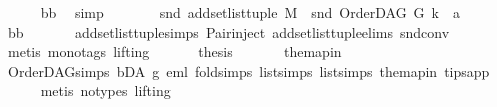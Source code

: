 \begin{isabellebody}
\ \ \ \ \isamarkupfalse%
\ bb\ \isamarkupfalse%
\ simp\ \isanewline
\ \ \isamarkupfalse%
\ \isamarkupfalse%
\ {\isachardoublequoteopen}\ snd\ {\isacharparenleft}{\kern0pt}add{\isacharunderscore}{\kern0pt}set{\isacharunderscore}{\kern0pt}list{\isacharunderscore}{\kern0pt}tuple\ {\isacharquery}{\kern0pt}M{\isacharparenright}{\kern0pt}\ {\isacharequal}{\kern0pt}\ snd\ {\isacharparenleft}{\kern0pt}OrderDAG\ G\ k{\isacharparenright}{\kern0pt}\ {\isacharat}{\kern0pt}\ {\isacharbrackleft}{\kern0pt}a{\isacharbrackright}{\kern0pt}{\isachardoublequoteclose}\isanewline
\ \ \ \ \isamarkupfalse%
\ bb\ \isanewline
\ \ \ \ \isamarkupfalse%
\ add{\isacharunderscore}{\kern0pt}set{\isacharunderscore}{\kern0pt}list{\isacharunderscore}{\kern0pt}tuple{\isachardot}{\kern0pt}simps\ Pair{\isacharunderscore}{\kern0pt}inject\ add{\isacharunderscore}{\kern0pt}set{\isacharunderscore}{\kern0pt}list{\isacharunderscore}{\kern0pt}tuple{\isachardot}{\kern0pt}elims\ snd{\isacharunderscore}{\kern0pt}conv\isanewline
\ \ \ \ \isamarkupfalse%
\ {\isacharparenleft}{\kern0pt}metis\ {\isacharparenleft}{\kern0pt}mono{\isacharunderscore}{\kern0pt}tags{\isacharcomma}{\kern0pt}\ lifting{\isacharparenright}{\kern0pt}{\isacharparenright}{\kern0pt}\ \isanewline
\ \ \isamarkupfalse%
\ \isamarkupfalse%
\ {\isacharquery}{\kern0pt}thesis\ \isanewline
\ \ \ \ \isamarkupfalse%
\ the{\isacharunderscore}{\kern0pt}map{\isacharunderscore}{\kern0pt}in\ \isanewline
\ \ \ \ \isamarkupfalse%
\ OrderDAG{\isachardot}{\kern0pt}simps\ bD{\isacharunderscore}{\kern0pt}A\ g{}\ eml\ fold{\isacharunderscore}{\kern0pt}simps{\isacharparenleft}{\kern0pt}{}{\isacharparenright}{\kern0pt}\ list{\isachardot}{\kern0pt}simps{\isacharparenleft}{\kern0pt}{}{\isacharparenright}{\kern0pt}\ list{\isachardot}{\kern0pt}simps{\isacharparenleft}{\kern0pt}{}{\isacharparenright}{\kern0pt}\ the{\isacharunderscore}{\kern0pt}map{\isacharunderscore}{\kern0pt}in\ tips{\isacharunderscore}{\kern0pt}app\isanewline
\ \ \ \ \isamarkupfalse%
\ {\isacharparenleft}{\kern0pt}metis\ {\isacharparenleft}{\kern0pt}no{\isacharunderscore}{\kern0pt}types{\isacharcomma}{\kern0pt}\ lifting{\isacharparenright}{\kern0pt}{\isacharparenright}{\kern0pt}\ \isanewline
{}\isamarkupfalse%
%
\endisatagproof
{\isafoldproof}%
%
\isadelimproof
\ \isanewline
%
\endisadelimproof
\ \ \isanewline
{}\isamarkupfalse%

\end{isabellebody}
